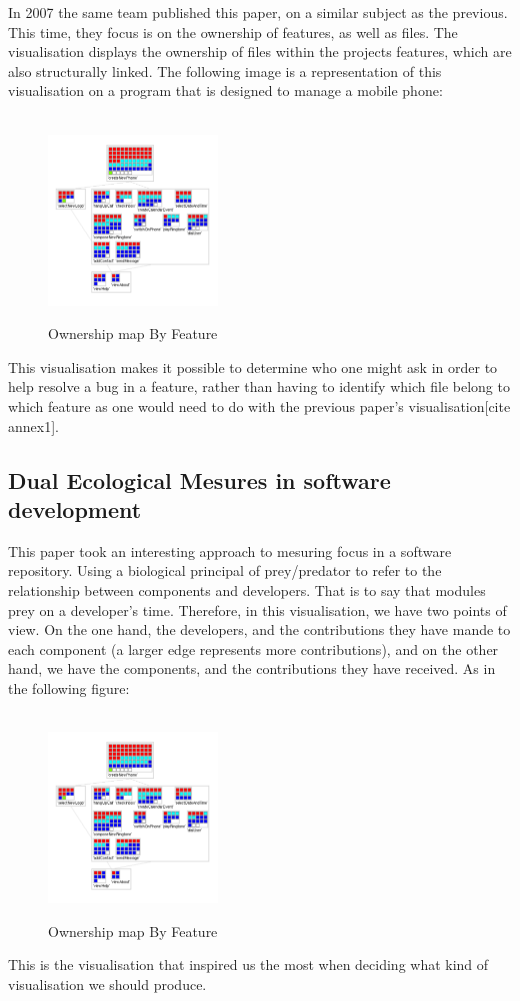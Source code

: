 In 2007 the same team published this paper, on a similar subject as the previous. This time, they focus is on the ownership of features, as well as files. The visualisation displays the ownership of files within the projects features, which are also structurally linked. The following image is a representation of this visualisation on a program that is designed to manage a mobile phone:\\
\\
\begin{figure}[p]
\centering
\includegraphics[width=0.4\textwidth]{./resources/girba2007.png}~
\caption{Ownership map By Feature}
\label{fig:ownership_map_by_feature}
\end{figure}

This visualisation makes it possible to determine who one might ask in order to help resolve a bug in a feature, rather than having to identify which file belong to which feature as one would need to do with the previous paper's visualisation[cite annex1].

\subsection{Dual Ecological Mesures in software development}

This paper took an interesting approach to mesuring focus in a software repository. Using a biological principal of prey/predator to refer to the relationship between components and developers. That is to say that modules prey on a developer's time. Therefore, in this visualisation, we have two points of view. On the one hand, the developers, and the contributions they have mande to each component (a larger edge represents more contributions), and on the other hand, we have the components, and the contributions they have received. As in the following figure:\\
\\
\begin{figure}[p]
\centering
\includegraphics[width=0.4\textwidth]{./resources/girba2007.png}~
\caption{Ownership map By Feature}
\label{fig:ownership_map_by_feature}
\end{figure}

This is the visualisation that inspired us the most when deciding what kind of visualisation we should produce.